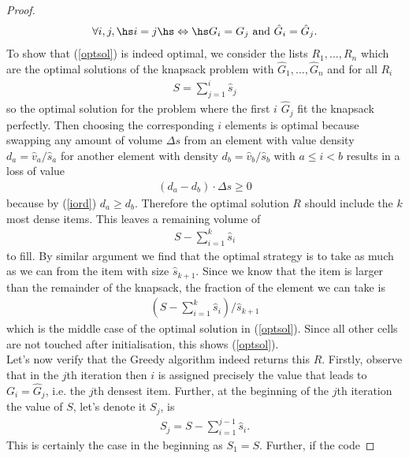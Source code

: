\documentclass{article}
\begin{document}
\begin{proof}
\begin{align*}
        \forall i,j,\hs i=j \hs \Leftrightarrow \hs G_i = G_j \text{ and } \hat G_i = \hat G_j.
    \end{align*}
    To show that (\ref{optsol}) is indeed optimal, 
    we consider the lists $R_1, ..., R_n$ which are the optimal
    solutions of the knapsack problem with $\hat G_1, ..., \hat G_n$ and for all $R_i$
    \begin{align*}
        S = \sum_{j=1}^i \hat s_j
    \end{align*}
    so the optimal solution for the problem where the first $i$ $\hat G_j$
    fit the knapsack perfectly. Then choosing the corresponding $i$ elements
    is optimal because swapping any amount of volume $\Delta s$ from an
    element with value density $d_a = \hat v_a / \hat s_a$ for another element
    with density $d_b = \hat v_b / \hat s_b$ with $a\leq i < b$ results in a
    loss of value
    \begin{align*}
        (d_a - d_b) \cdot \Delta s \geq 0
    \end{align*}
    because by (\ref{iord}) $d_a\geq d_b$. Therefore the optimal solution $R$
    should include the $k$ most dense items. This leaves a remaining volume 
    of
    \begin{align*}
        S - \sum_{i=1}^k \hat s_i
    \end{align*}
    to fill. By similar argument we find that the optimal strategy is to take
    as much as we can from the item with size $\hat s_{k+1}$. Since we know
    that the item is larger than the remainder of the knapsack, the fraction
    of the element we can take is
    \begin{align*}
        \left(S - \sum_{i=1}^k \hat s_i\right)/\hat s_{k+1}
    \end{align*}
    which is the middle case of the optimal solution in (\ref{optsol}). 
    Since all other cells are not touched after initialisation, this shows (\ref{optsol}).\\
    Let's now verify that the Greedy algorithm indeed returns this $R$. 
    Firstly, observe that in the $j$th iteration then 
    $i$ is assigned precisely the value that leads to $G_i=\hat G_j$, 
    i.e. the $j$th densest item.
    Further, at the beginning of the $j$th iteration the value of $S$, let's denote it $S_j$,
    is
    \begin{align}
        \label{sj}
        S_j = S - \sum_{i=1}^{j-1} \hat s_i.
    \end{align}
    This is certainly the case in the beginning as $S_1=S$. Further, if the code

\end{proof}
\end{document}
